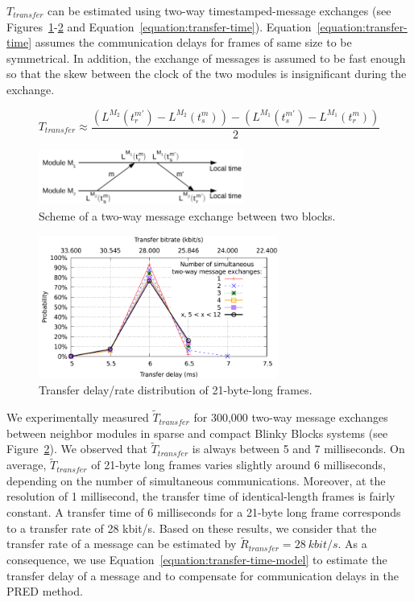 $T_{transfer}$ can be estimated using two-way timestamped-message exchanges (see Figures~\ref{fig:time-sync:transfer-time-1}-\ref{fig:time-sync:transfer-time-2} and Equation~\eqref{equation:transfer-time}). Equation~\eqref{equation:transfer-time} assumes the communication delays for frames of same size to be symmetrical. In addition, the exchange of messages is assumed to be fast enough so that the skew between the clock of the two modules is insignificant during the exchange.

{
	\begin{equation}
	\label{equation:transfer-time}
	T_{transfer} \approx \frac{(L^{M_2}(t_r^{m'}) - L^{M_2}(t_s^m)) - (L^{M_1}(t_s^{m'})-L^{M_1}(t_r^m))}{2}
	\end{equation}
}


\begin{figure}[h!]
	\centering
	\includegraphics[width=0.6\textwidth]{images/time-synchronization/transfer.pdf}
	\caption{Scheme of a two-way message exchange between two blocks.}
	\label{fig:time-sync:transfer-time-1}
\end{figure}

\begin{figure}[h!]
	\centering
	\includegraphics[width=0.7\textwidth]{images/time-synchronization/delayNeighborhood-article.pdf}	
	\caption{Transfer delay/rate distribution of 21-byte-long frames.}
	\label{fig:time-sync:transfer-time-2}
\end{figure}

We experimentally measured $\widetilde{T}_{transfer}$ for 300,000 two-way message exchanges between neighbor modules in sparse and compact Blinky Blocks systems (see Figure~\ref{fig:time-sync:transfer-time-2}). We observed that $\widetilde{T}_{transfer}$ is always between 5 and 7 milliseconds. On average, $\widetilde{T}_{transfer}$ of 21-byte long frames varies slightly around 6 milliseconds, depending on the number of simultaneous communications. Moreover, at the resolution of 1 millisecond, the transfer time of identical-length frames is fairly constant. A transfer time of 6 milliseconds for a 21-byte long frame corresponds to a transfer rate of 28 kbit/s. Based on these results, we consider that the transfer rate of a message can be estimated by $\widetilde{R}_{transfer} = 28\ kbit/s$. As a consequence, we use Equation~\eqref{equation:transfer-time-model} to estimate the transfer delay of a message and to compensate for communication delays in the PRED method.

